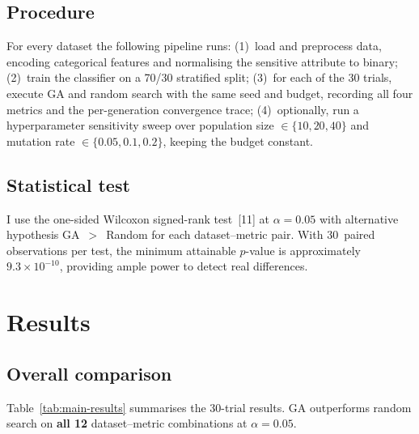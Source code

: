 \documentclass[10pt]{article}
\begin{document}
\subsection{Procedure}
For every dataset the following pipeline runs:
(1)~load and preprocess data, encoding categorical features and normalising the
sensitive attribute to binary;
(2)~train the classifier on a 70/30 stratified split;
(3)~for each of the 30 trials, execute GA and random search with the same seed and
budget, recording all four metrics and the per-generation convergence trace;
(4)~optionally, run a hyperparameter sensitivity sweep over population size
$\in \{10, 20, 40\}$ and mutation rate $\in \{0.05, 0.1, 0.2\}$, keeping the budget
constant.

\subsection{Statistical test}
I use the one-sided Wilcoxon signed-rank test~[11] at $\alpha{=}0.05$ with alternative
hypothesis GA~$>$~Random for each dataset--metric pair.  With 30~paired observations per
test, the minimum attainable $p$-value is approximately $9.3 \times 10^{-10}$, providing
ample power to detect real differences.

\section{Results}

\subsection{Overall comparison}

Table~\ref{tab:main-results} summarises the 30-trial results.  GA outperforms random
search on \textbf{all 12} dataset--metric combinations at $\alpha{=}0.05$.
\end{document}
